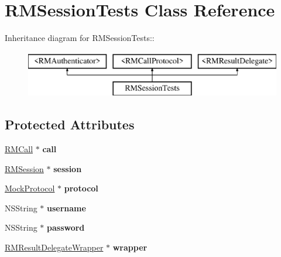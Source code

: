 \hypertarget{interface_r_m_session_tests}{
\section{RMSessionTests Class Reference}
\label{interface_r_m_session_tests}
}
Inheritance diagram for RMSessionTests::\begin{figure}[H]
\begin{center}
\leavevmode
\includegraphics[height=2cm]{interface_r_m_session_tests}
\end{center}
\end{figure}
\subsection*{Protected Attributes}
\begin{DoxyCompactItemize}
\item 
\hypertarget{interface_r_m_session_tests_abeeb4a2ae56b6847a234db1299576652}{
\hyperlink{interface_r_m_call}{RMCall} $\ast$ {\bfseries call}}
\label{interface_r_m_session_tests_abeeb4a2ae56b6847a234db1299576652}

\item 
\hypertarget{interface_r_m_session_tests_a15addac7538f41a12439e0babefa8935}{
\hyperlink{interface_r_m_session}{RMSession} $\ast$ {\bfseries session}}
\label{interface_r_m_session_tests_a15addac7538f41a12439e0babefa8935}

\item 
\hypertarget{interface_r_m_session_tests_a4033c142c7ba3bef1d359ef19b4382a7}{
\hyperlink{interface_mock_protocol}{MockProtocol} $\ast$ {\bfseries protocol}}
\label{interface_r_m_session_tests_a4033c142c7ba3bef1d359ef19b4382a7}

\item 
\hypertarget{interface_r_m_session_tests_ada7aafce83843a941668b5d0f83c9ad3}{
NSString $\ast$ {\bfseries username}}
\label{interface_r_m_session_tests_ada7aafce83843a941668b5d0f83c9ad3}

\item 
\hypertarget{interface_r_m_session_tests_a5b3ca57860668a61e67ded4d00a0eac5}{
NSString $\ast$ {\bfseries password}}
\label{interface_r_m_session_tests_a5b3ca57860668a61e67ded4d00a0eac5}

\item 
\hypertarget{interface_r_m_session_tests_af6938c01253d22abc67c39edc57528ca}{
\hyperlink{interface_r_m_result_delegate_wrapper}{RMResultDelegateWrapper} $\ast$ {\bfseries wrapper}}
\label{interface_r_m_session_tests_af6938c01253d22abc67c39edc57528ca}

\end{DoxyCompactItemize}



